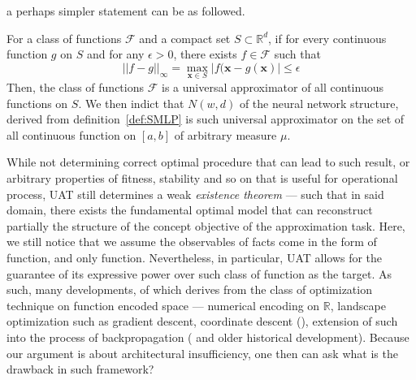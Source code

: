 a perhaps simpler statement can be as followed. 

\begin{theorem}
    For a class of functions $\mathcal{F}$ and a compact set $S\subset \mathbb{R}^{d}$, if for every continuous function $g$ on $S$ and for any $\epsilon>0$, there exists $f\in \mathcal{F}$ such that \begin{equation}
        ||f-g||_{\infty} = \max_{\mathbf{x}\in S} |f(\mathbf{x}-g(\mathbf{x})| \leq \epsilon
    \end{equation}
    Then, the class of functions $\mathcal{F}$ is a universal approximator of all continuous functions on $S$. We then indict that $N(w,d)$  of the neural network structure, derived from definition~\ref{def:SMLP} is such universal approximator on the set of all continuous function on $[a,b]$ of arbitrary measure $\mu$. 
\end{theorem}

While not determining correct optimal procedure that can lead to such result, or arbitrary properties of fitness, stability and so on that is useful for operational process, UAT still determines a weak \textit{existence theorem} --- such that in said domain, there exists the fundamental optimal model that can reconstruct partially the structure of the concept objective of the approximation task. Here, we still notice that we assume the observables of facts come in the form of function, and only function. Nevertheless, in particular, UAT allows for the guarantee of its expressive power over such class of function as the target. As such, many developments, of which derives from the class of optimization technique on function encoded space --- numerical encoding on $\mathbb{R}$, landscape optimization such as gradient descent, coordinate descent (\cite{luo1992convergence,tseng2001convergence,friedman2007pathwise,wright2015coordinate,tseng2009coordinate}), extension of such into the process of backpropagation (\cite{rumelhart1986learning} and older historical development). Because our argument is about architectural insufficiency, one then can ask what is the drawback in such framework? 

